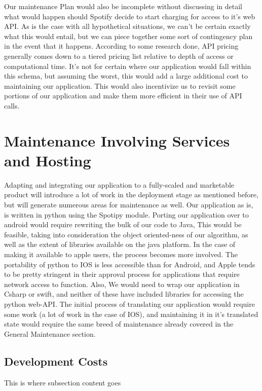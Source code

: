 \documentclass{roffin}
\begin{document}
Our maintenance Plan would also be incomplete without discussing in detail what would happen should Spotify decide to start charging for access to it's web API. As is the case with all hypothetical situations, we can't be certain exactly what this would entail, but we can piece together some sort of contingency plan in the event that it happens.  
According to some research done, API pricing generally comes down to a tiered pricing list relative to depth of access or computational time. It's not for certain where our application would fall within this schema, but assuming the worst, this would add a large additional cost to maintaining our application. This would also incentivize us to revisit some portions of our application and make them more efficient in their use of API calls. 




\section{Maintenance Involving Services and Hosting}
Adapting and integrating our application to a fully-scaled and marketable product will introduce a lot of work in the deployment stage as mentioned before, but will generate numerous areas for maintenance as well. Our application as is, is written in python using the Spotipy module. Porting our application over to android would require rewriting the bulk of our code to Java, This would be feasible, taking into consideration the object oriented-ness of our algorithm, as well as the extent of libraries available on the java platform. In the case of making it available to apple users, the process becomes more involved. The portability of python to IOS is less accessible than for Android, and Apple tends to be pretty stringent in their approval process for applications that require network access to function. Also, We would need to wrap our application in Csharp or swift, and neither of these have included libraries for accessing the python web-API. The initial process of translating our application would require some work (a lot of work in the case of IOS), and maintaining it in it's translated state would require the same breed of maintenance already covered in the General Maintenance section. 

\subsection{Development Costs}
This is where subsection content goes
\end{document}
